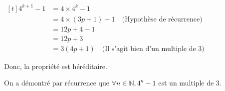 \documentclass[12pt, a4paper]{article}
\begin{document}
    {\begin{center}
    $\begin{aligned}[t]
        4^{k+1}-1&=4\times 4^k-1 &\\
        &= 4\times\left(3p+1\right)-1 \quad \text{(Hypothèse de récurrence)} &\\
        &=12p+4-1 &\\
        &=12p+3 &\\
        &=3\left(4p+1\right) \quad \text{(Il s'agit bien d'un multiple de 3)}
    \end{aligned}$
    \end{center}} \vspace{\baselineskip}
    {\indent\parbox[t]{\dimexpr\linewidth-\parindent}{
    Donc, la propriété est héréditaire.

    On a démontré par récurrence que $\forall n\in\mathbb{N},4^n-1$ est un multiple de 3.
    }} 
\end{document}
